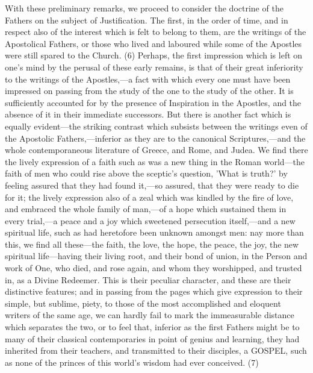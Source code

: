 \documentclass[
]{book}
\begin{document}
With these preliminary remarks, we proceed to consider the doctrine of the Fathers on the subject of Justification. The first, in the order of time, and in respect also of the interest which is felt to belong to them, are the writings of the Apostolical Fathers, or those who lived and laboured while some of the Apostles were still spared to the Church. (6) Perhaps, the first impression which is left on one's mind by the perusal of these early remains, is that of their great inferiority to the writings of the Apostles,---a fact with which every one must have been impressed on passing from the study of the one to the study of the other. It is sufficiently accounted for by the presence of Inspiration in the Apostles, and the absence of it in their immediate successors. But there is another fact which is equally evident---the striking contrast which subsists between the writings even of the Apostolic Fathers,---inferior as they are to the canonical Scriptures,---and the whole contemporaneous literature of Greece, and Rome, and Judea. We find there the lively expression of a faith such as was a new thing in the Roman world---the faith of men who could rise above the sceptic's question, 'What is truth?' by feeling assured that they had found it,---so assured, that they were ready to die for it; the lively expression also of a zeal which was kindled by the fire of love, and embraced the whole family of man,---of a hope which sustained them in every trial,---a peace and a joy which sweetened persecution itself,---and a new spiritual life, such as had heretofore been unknown amongst men: nay more than this, we find all these---the faith, the love, the hope, the peace, the joy, the new spiritual life---having their living root, and their bond of union, in the Person and work of One, who died, and rose again, and whom they worshipped, and trusted in, as a Divine Redeemer. This is their peculiar character, and these are their distinctive features; and in passing from the pages which give expression to their simple, but sublime, piety, to those of the most accomplished and eloquent writers of the same age, we can hardly fail to mark the immeasurable distance which separates the two, or to feel that, inferior as the first Fathers might be to many of their classical contemporaries in point of genius and learning, they had inherited from their teachers, and transmitted to their disciples, a GOSPEL, such as none of the princes of this world's wisdom had ever conceived. (7)
\end{document}
